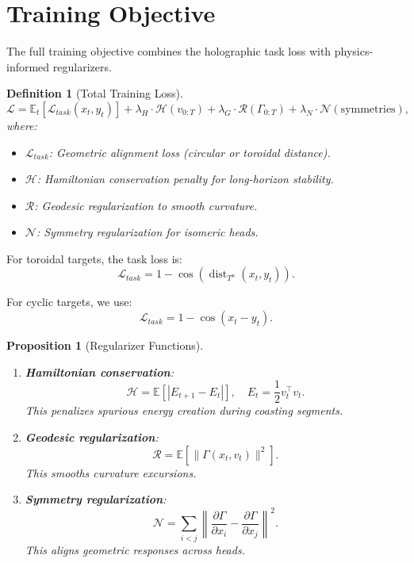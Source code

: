 \documentclass[12pt,letterpaper,twoside]{article}
\newtheorem{definition}{Definition}[section]
\newtheorem{prop}{Proposition}[section]
\begin{document}
\section{Training Objective}

The full training objective combines the holographic task loss with physics-informed regularizers.

\begin{definition}[Total Training Loss]
\[
\mathcal{L} = \mathbb{E}_t\left[\mathcal{L}_{task}(x_t, y_t)\right]
    + \lambda_H \cdot \mathcal{H}(v_{0:T})
    + \lambda_G \cdot \mathcal{R}(\Gamma_{0:T})
    + \lambda_N \cdot \mathcal{N}(\text{symmetries}),
\]
where:
\begin{itemize}
\item $\mathcal{L}_{task}$: Geometric alignment loss (circular or toroidal distance).
\item $\mathcal{H}$: Hamiltonian conservation penalty for long-horizon stability.
\item $\mathcal{R}$: Geodesic regularization to smooth curvature.
\item $\mathcal{N}$: Symmetry regularization for isomeric heads.
\end{itemize}
\end{definition}

For toroidal targets, the task loss is:
\[
\mathcal{L}_{task} = 1 - \cos\left(\operatorname{dist}_{T^n}(x_t, y_t)\right).
\]

For cyclic targets, we use:
\[
\mathcal{L}_{task} = 1 - \cos(x_t - y_t).
\]

\begin{prop}[Regularizer Functions]
\begin{enumerate}
\item \textbf{Hamiltonian conservation}:
\[
\mathcal{H} = \mathbb{E}\left[|E_{t+1} - E_t|\right], \quad E_t = \frac{1}{2}v_t^\top v_t.
\]
This penalizes spurious energy creation during coasting segments.

\item \textbf{Geodesic regularization}:
\[
\mathcal{R} = \mathbb{E}\left[\|\Gamma(x_t, v_t)\|^2\right].
\]
This smooths curvature excursions.

\item \textbf{Symmetry regularization}:
\[
\mathcal{N} = \sum_{i < j} \left\|\frac{\partial \Gamma}{\partial x_i} - \frac{\partial \Gamma}{\partial x_j}\right\|^2.
\]
This aligns geometric responses across heads.
\end{enumerate}
\end{prop}
\end{document}
